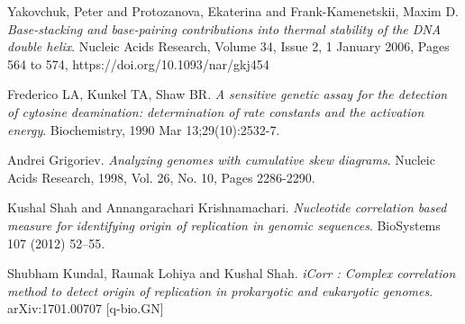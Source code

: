 \documentclass[10pt]{article}
\begin{document}
\begin{thebibliography}{9}

Yakovchuk, Peter and Protozanova, Ekaterina and Frank-Kamenetskii, Maxim D.
\textit{Base-stacking and base-pairing contributions into thermal stability of the DNA double helix}.
Nucleic Acids Research, Volume 34, Issue 2, 1 January 2006, Pages 564 to 574, https://doi.org/10.1093/nar/gkj454

Frederico LA, Kunkel TA, Shaw BR.
\textit{A sensitive genetic assay for the detection of cytosine deamination: determination of rate constants and the activation energy}.
Biochemistry, 1990 Mar 13;29(10):2532-7.

Andrei Grigoriev.
\textit{Analyzing genomes with cumulative skew diagrams}.
Nucleic Acids Research, 1998, Vol. 26, No. 10, Pages 2286-2290.

Kushal Shah and Annangarachari Krishnamachari.
\textit{Nucleotide correlation based measure for identifying origin of replication in genomic sequences}.
BioSystems 107 (2012) 52–55.

Shubham Kundal, Raunak Lohiya and Kushal Shah.
\textit{iCorr : Complex correlation method to detect origin of replication in prokaryotic and eukaryotic genomes}.
arXiv:1701.00707 [q-bio.GN]


\end{thebibliography}
\end{document}
